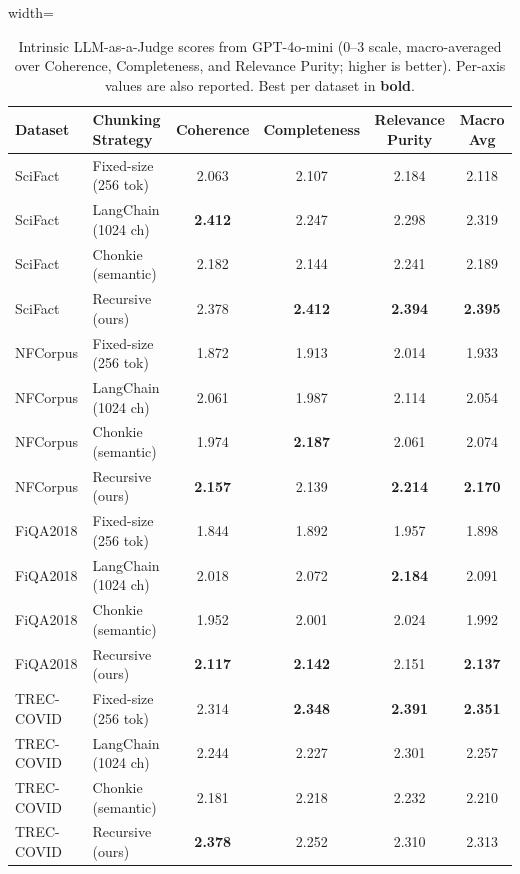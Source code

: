 \begin{table}[t]
\centering
\caption{Intrinsic LLM-as-a-Judge scores from GPT-4o-mini (0--3 scale, macro-averaged over Coherence, Completeness, and Relevance Purity; higher is better). Per-axis values are also reported. Best per dataset in \textbf{bold}.}
\label{tab:llm_judge_results}
\begin{adjustbox}{width=\textwidth}
\begin{tabular}{ll cccc}
\toprule
Dataset & Chunking Strategy & Coherence & Completeness & Relevance Purity & Macro Avg \\
\midrule
SciFact   & Fixed-size (256 tok) & 2.063 & 2.107 & 2.184 & 2.118 \\
SciFact   & LangChain (1024 ch)  & \textbf{2.412} & 2.247 & 2.298 & 2.319 \\
SciFact   & Chonkie (semantic)   & 2.182 & 2.144 & 2.241 & 2.189 \\
SciFact   & Recursive (ours)     & 2.378 & \textbf{2.412} & \textbf{2.394} & \textbf{2.395} \\
\midrule
NFCorpus  & Fixed-size (256 tok) & 1.872 & 1.913 & 2.014 & 1.933 \\
NFCorpus  & LangChain (1024 ch)  & 2.061 & 1.987 & 2.114 & 2.054 \\
NFCorpus  & Chonkie (semantic)   & 1.974 & \textbf{2.187} & 2.061 & 2.074 \\
NFCorpus  & Recursive (ours)     & \textbf{2.157} & 2.139 & \textbf{2.214} & \textbf{2.170} \\
\midrule
FiQA2018  & Fixed-size (256 tok) & 1.844 & 1.892 & 1.957 & 1.898 \\
FiQA2018  & LangChain (1024 ch)  & 2.018 & 2.072 & \textbf{2.184} & 2.091 \\
FiQA2018  & Chonkie (semantic)   & 1.952 & 2.001 & 2.024 & 1.992 \\
FiQA2018  & Recursive (ours)     & \textbf{2.117} & \textbf{2.142} & 2.151 & \textbf{2.137} \\
\midrule
TREC-COVID & Fixed-size (256 tok) & 2.314 & \textbf{2.348} & \textbf{2.391} & \textbf{2.351} \\
TREC-COVID & LangChain (1024 ch)  & 2.244 & 2.227 & 2.301 & 2.257 \\
TREC-COVID & Chonkie (semantic)   & 2.181 & 2.218 & 2.232 & 2.210 \\
TREC-COVID & Recursive (ours)     & \textbf{2.378} & 2.252 & 2.310 & 2.313 \\
\bottomrule
\end{tabular}
\end{adjustbox}
\end{table}

